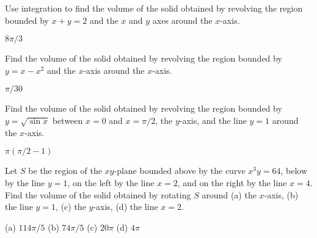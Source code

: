 \begin{exercises}





\begin{exercise}
Use integration to find the volume of the solid obtained by revolving 
the region bounded by $x+y=2$ and the $x$ and $y$ axes around the
$x$-axis. 
\begin{answer} $8\pi/3$
\end{answer}\end{exercise}

\begin{exercise}
Find the volume of the solid obtained by revolving 
the region bounded by $y=x-x^2$
and the $x$-axis around the
$x$-axis. 
\begin{answer} $\pi/30$
\end{answer}\end{exercise}

\begin{exercise}
Find the volume of the solid obtained by revolving 
the region bounded by $y=\sqrt{\sin x}$ between $x=0$ and
$x=\pi/2$, the $y$-axis, and the line
$y=1$ around the
$x$-axis. 
\begin{answer} $\pi(\pi/2-1)$
\end{answer}\end{exercise}

\begin{exercise}
Let $S$ be the region of the $xy$-plane bounded above by the curve
$x^3y=64$, below by the line $y=1$, on the left by  the line $x=2$, and
on the right by the line $x=4$.  Find
the volume of the solid obtained by rotating $S$ around (a) the $x$-axis,
(b) the line $y=1$, (c) the $y$-axis, (d) the line $x=2$.
\begin{answer} (a) $114\pi/5$ (b) $74\pi/5$ (c) $20\pi$\hfill\break
(d) $4\pi$
\end{answer}\end{exercise}


\end{exercises}
